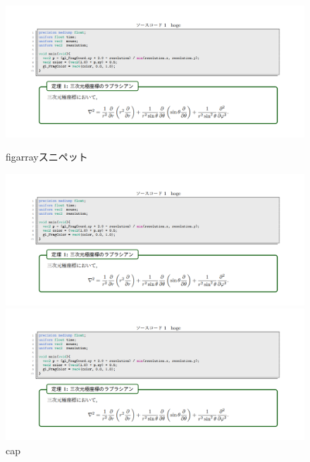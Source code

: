 \documentclass[uplatex,dvipdfmx,ja=standard,a4paper]{bxjsarticle}
\begin{document}
\begin{figure}[h]
  \centering
  \begin{minipage}[t]{0.24\columnwidth}
    \centering
    \includegraphics[keepaspectratio, width=\columnwidth]{hoge.png}
    \caption{figarrayスニペット}
    \label{fig:hoge1}
  \end{minipage}
  \begin{minipage}[t]{0.24\columnwidth}
    \centering
    \includegraphics[keepaspectratio, width=\columnwidth]{hoge.png}
    \caption{cap}
    \label{fig:hoge2}
  \end{minipage}
  \begin{minipage}[t]{0.24\columnwidth}
    \centering
    \includegraphics[keepaspectratio, width=\columnwidth]{hoge.png}

\end{minipage}
\end{figure}
\end{document}
